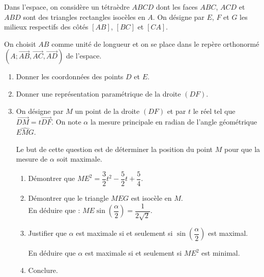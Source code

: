 \documentclass{cornouaille}
\begin{document}
\begin{exercice}
  Dans l'espace, on considère un tétraèdre $ABCD$ dont les faces
  $ABC$, $ACD$ et $ABD$ sont des triangles rectangles isocèles en
  $A$. On désigne par $E$, $F$ et $G$ les milieux respectifs des côtés
  $[AB]$, $[BC]$ et $[CA]$.

  On choisit $AB$ comme unité de longueur et on se place dans le
  repère orthonormé
  $(A;\overrightarrow{AB},\overrightarrow{AC},\overrightarrow{AD})$
  de l'espace.
  \begin{enumerate}
  \item Donner les coordonnées des points $D$ et $E$.
  \item Donner une représentation paramétrique de la droite $(DF)$.
  \item On désigne par $M$ un point de la droite $(DF)$ et par $t$ le
    réel tel que $\overrightarrow{DM}=t\overrightarrow{DF}$. On note
    $\alpha$ la mesure principale en radian de l'angle géométrique
    $\widehat{EMG}$.

    Le but de cette question est de déterminer la position du point
    $M$ pour que la mesure de $\alpha$ soit maximale.
    \begin{enumerate}
    \item Démontrer que
      $ME^2=\dfrac{3}{2}t^2-\dfrac{5}{2}t+\dfrac{5}{4}$.

      

    \item Démontrer que le triangle $MEG$ est isocèle en $M$.\\
      En déduire que :
      $ME \sin(\dfrac{\alpha}{2})=\dfrac{1}{2\sqrt{2}}$.
    \item Justifier que $\alpha$ est maximale si et seulement si
      $\sin(\dfrac{\alpha}{2})$ est maximal.

      En déduire que $\alpha$ est maximale si et seulement si $ME^2$
      est minimal.
    \item Conclure.
    \end{enumerate}
  \end{enumerate}
\end{exercice}
\end{document}
